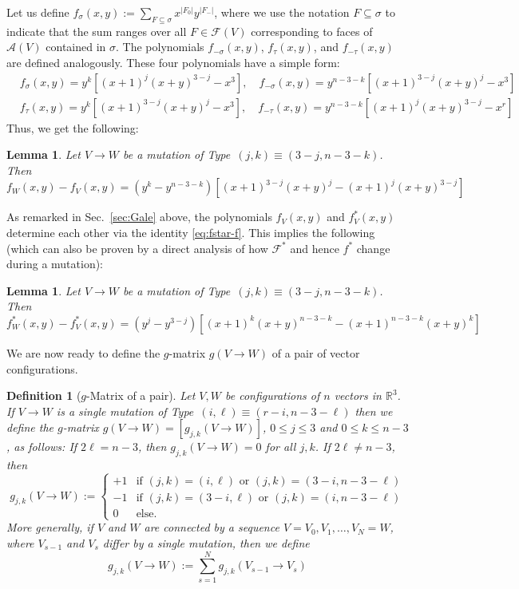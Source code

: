 \documentclass[11pt]{article}
\newtheorem{lemma}[theorem]{Lemma}
\newtheorem{definition}[theorem]{Definition}
\newcommand{\arr}{\mathcal{A}}
\renewcommand{\leq}{\leqslant}
\newcommand{\R}{\mathbb{R}}
\begin{document}
Let us define $f_\sigma(x,y):=\sum_{F\subseteq \sigma}  x^{|F_0|}y^{|F_-|}$, 
where we use the notation $F\subseteq \sigma$ to indicate that the sum ranges over all $F \in \mathcal{F}(V)$ corresponding to faces of $\arr(V)$ contained in $\sigma$. The polynomials $f_{-\sigma}(x,y)$,  $f_\tau(x,y)$, and $f_{-\tau}(x,y)$ are defined analogously. 
These four polynomials have a simple form:
\begin{eqnarray*}
& f_\sigma (x,y)=y^k\left[(x+1)^{j}(x+y)^{3-j}-x^3\right],\quad f_{-\sigma}(x,y)=y^{n-3-k}\left[(x+1)^{3-j}(x+y)^{j}-x^3\right] & \\
& f_\tau(x,y)=y^k\left[(x+1)^{3-j}(x+y)^{j}-x^3\right],\quad f_{-\tau}(x,y)=y^{n-3-k}\left[(x+1)^{j}(x+y)^{3-j}-x^r\right]
\end{eqnarray*}
Thus, we get the following:
\begin{lemma}
\label{lem:f-mutation}
Let $V\to W$ be a mutation of Type~$(j,k)\equiv(3-j,n-3-k)$. Then
\begin{equation}
\label{eq:f-g-mutation}
f_W(x,y)-f_V(x,y) = \left(y^k - y^{n-3-k}\right)\left[(x+1)^{3-j}(x+y)^{j} - (x+1)^{j}(x+y)^{3-j}\right]
\end{equation}
\end{lemma}
As remarked in Sec.~\ref{sec:Gale} above, the polynomials $f_V(x,y)$ and $f^*_V(x,y)$ determine each other via the identity \eqref{eq:fstar-f}. This implies the following (which can also be proven by a direct analysis of how $\mathcal{F}^*$ and hence $f^*$ change during a mutation):
\begin{lemma}
\label{lem:fstar-mutation}
Let $V\to W$ be a mutation of Type~$(j,k)\equiv(3-j,n-3-k)$. Then
\begin{equation}
\label{eq:fstar-g-mutation}
f^*_W(x,y)-f^*_V(x,y) = \left(y^j - y^{3-j}\right)\left[(x+1)^{k}(x+y)^{n-3-k} - (x+1)^{n-3-k}(x+y)^{k}\right]
\end{equation}
\end{lemma}
%
We are now ready to define the $g$-matrix $g(V\rightarrow W)$ of a pair of vector configurations. 
\begin{definition}[$g$-Matrix of a pair]
\label{def:g-pair}
Let $V,W$ be configurations of $n$ vectors in $\R^3$. 
%
If $V\to W$ is a single mutation of Type~$(i,\ell)\equiv(r-i,n-3-\ell)$ then we define the $g$-matrix 
$g(V\rightarrow W)=[g_{j,k}(V\rightarrow W)]$, $0\leq j\leq 3$ and $0\leq k \leq n-3$, as follows: 
%
If 
$2\ell=n-3$, then $g_{j,k}(V\to W)=0$ for all $j,k$. If 
$2\ell\neq n-3$, then
\[
g_{j,k}(V\to W):= 
\begin{cases}
  +1 & \textrm{if } (j,k)=(i,\ell) \textrm{ or }(j,k)=(3-i,n-3-\ell)\\
  -1 & \textrm{if } (j,k)=(3-i,\ell) \textrm{ or }(j,k)=(i,n-3-\ell)\\
  0 & \textrm{else.}  
\end{cases}
\]
More generally, if $V$ and $W$ are connected by a sequence $V=V_0, V_1,\dots, V_N=W$, where $V_{s-1}$ and $V_s$ differ by a single mutation, then we define
\[
g_{j,k}(V\to W):= \sum_{s=1}^N g_{j,k}(V_{s-1}\to V_s)
\]
\end{definition}
\end{document}
